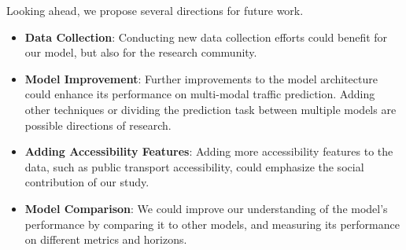 Looking ahead, we propose several directions for future work.
\begin{itemize}
    \item \textbf{Data Collection}:
    Conducting new data collection efforts could benefit for our model, but also for the research community.
    \item \textbf{Model Improvement}:
    Further improvements to the model architecture could enhance its performance on multi-modal traffic prediction.
    Adding other techniques or dividing the prediction task between multiple models are possible directions of research.
    \item \textbf{Adding Accessibility Features}:
    Adding more accessibility features to the data, such as public transport accessibility, could emphasize the social contribution of our study.
    \item \textbf{Model Comparison}:
    We could improve our understanding of the model's performance by comparing it to other models, and measuring its performance on different metrics and horizons.
\end{itemize}

